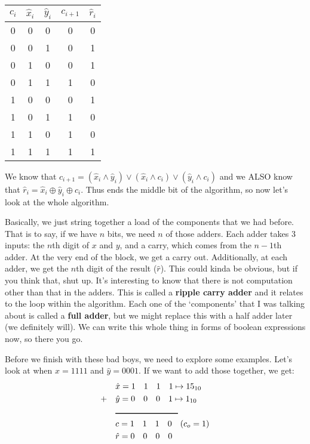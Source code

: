 \documentclass[11pt,a4paper,titlepage,dvipsnames,cmyk]{scrartcl}
\begin{document}
\begin{center}
    \begin{tabular}{|c c c|c|c|}
        \hline
        $c_i$ & $\hat x_i$ & $\hat y_i$ & $c_{i+1}$ & $\hat r_i$ \\
        \hline
        0 & 0 & 0 & 0 & 0 \\
        \hline
        0 & 0 & 1 & 0 & 1 \\
        \hline
        0 & 1 & 0 & 0 & 1 \\
        \hline
        0 & 1 & 1 & 1 & 0 \\
        \hline
        1 & 0 & 0 & 0 & 1 \\
        \hline
        1 & 0 & 1 & 1 & 0 \\
        \hline
        1 & 1 & 0 & 1 & 0 \\
        \hline
        1 & 1 & 1 & 1 & 1 \\
        \hline
    \end{tabular}
\end{center}

We know that $c_{i+1} = (\hat x_i \wedge \hat y_i) \vee (\hat x_i \wedge c_i)
\vee (\hat y_i \wedge c_i)$ and we ALSO know that $\hat r_i = \hat x_i \oplus
\hat y_i \oplus c_i$. Thus ends the middle bit of the algorithm, so now let's
look at the whole algorithm.

Basically, we just string together a load of the components that we had before.
That is to say, if we have $n$ bits, we need $n$ of those adders. Each adder
takes 3 inputs: the $n$th digit of $x$ and $y$, and a carry, which comes from
the $n-1$th adder. At the very end of the block, we get a carry out.
Additionally, at each adder, we get the $n$th digit of the result ($\hat r$).
This could kinda be obvious, but if you think that, shut up. It's interesting to
know that there is not computation other than that in the adders. This is called
a \textbf{ripple carry adder} and it relates to the loop within the algorithm.
Each one of the `components' that I was talking about is called a \textbf{full
adder}, but we might replace this with a half adder later (we definitely will).
We can write this whole thing in forms of boolean expressions now, so there you
go.

Before we finish with these bad boys, we need to explore some examples. Let's
look at when $\hat x = 1111$ and $\hat y = 0001$. If we want to add those
together, we get:
\begin{align*}
    &\hat x = 1 \quad 1 \quad 1 \quad 1 \mapsto 15_{10} \\
    + \quad &\hat y = 0 \quad 0 \quad 0 \quad 1 \mapsto 1_{10} \\
         &\rule{75pt}{1pt}\\
         &c = 1 \quad 1 \quad 1 \quad 0 \quad (c_o = 1)\\
    &\hat r = 0 \quad 0 \quad 0 \quad 0
\end{align*}
\end{document}
